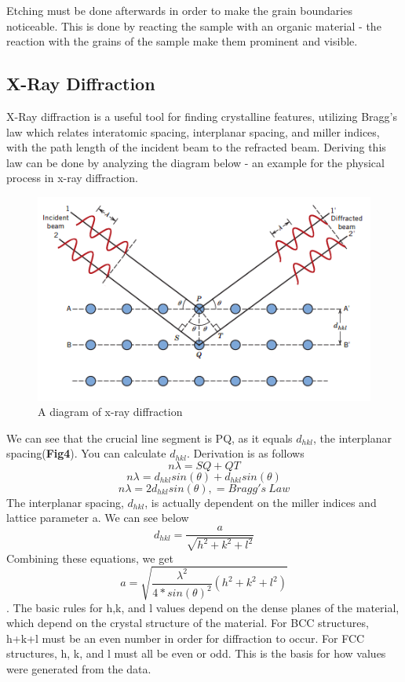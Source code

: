 \documentclass{article}
\begin{document}
Etching must be done afterwards in order to make the grain boundaries noticeable. This is done by reacting the sample with an organic material - the reaction with the grains of the sample make them prominent and visible.

\subsection{X-Ray Diffraction}

X-Ray diffraction is a useful tool for finding crystalline features, utilizing Bragg's law which relates interatomic spacing, interplanar spacing, and miller indices, with the path length of the incident beam to the refracted beam. Deriving this law can be done by analyzing the diagram below - an example for the physical process in x-ray diffraction.

\begin{figure}[h]
	\centering
	\includegraphics[scale=1]{bragg.png}
	\caption{A diagram of x-ray diffraction}
\end{figure}

We can see that the crucial line segment is PQ, as it equals $d_{hkl}$, the interplanar spacing(\textbf{Fig4}). You can calculate $d_{hkl}$. Derivation is as follows
$$n\lambda = SQ + QT$$
$$n\lambda = d_{hkl}sin(\theta ) + d_{hkl}sin(\theta )$$
$$n\lambda = 2d_{hkl}sin(\theta ), = Bragg's\ Law$$
The interplanar spacing, $d_{hkl}$, is actually dependent on the miller indices and lattice parameter a. We can see below
$$d_{hkl} = \frac{a}{\sqrt{h^2+k^2+l^2}}$$
Combining these equations, we get
$$a = \sqrt{\frac{\lambda ^2}{4*sin(\theta)^2}(h^2+k^2+l^2)}$$.
The basic rules for h,k, and l values depend on the dense planes of the material, which depend on the crystal structure of the material. For BCC structures, h+k+l must be an even number in order for diffraction to occur. For FCC structures, h, k, and l must all be even or odd.
This is the basis for how values were generated from the data.
\end{document}
